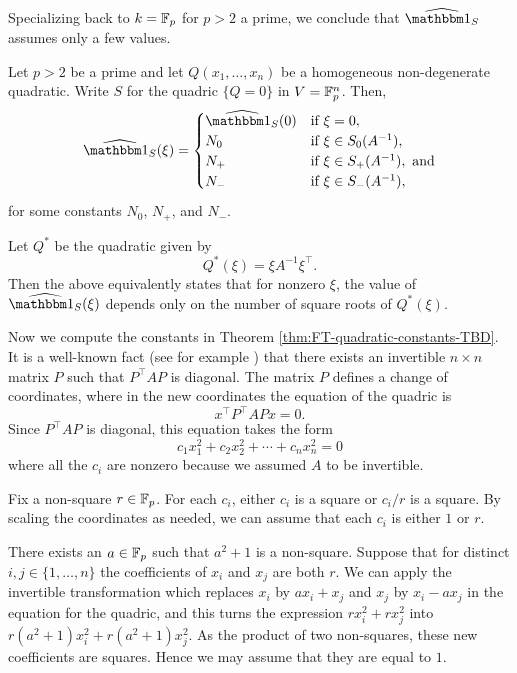 Specializing back to $k=\mathbb{F}_p$ for $p>2$ a prime, we conclude that $\widehat{\IND_S}$ assumes only a few values.

\begin{thm}\label{thm:FT-quadratic-constants-TBD}
	Let $p > 2$ be a prime and let $Q(x_1,\ldots,x_n)$ be a homogeneous non-degenerate quadratic. Write $S$ for the quadric $\{Q = 0\}$ in $V=\mathbb{F}_p^n$. Then,
	\begin{equation}
	\widehat{\IND_S}(\xi) = \begin{cases}
	\widehat{\IND_S}(0) & \text{if } \xi = 0,\\
	N_0 & \text{if } \xi \in S_0(A^{-1}),\\
	N_+ & \text{if } \xi \in S_+(A^{-1}), \text{ and}\\
	N_- & \text{if } \xi \in S_-(A^{-1}),
	\end{cases}
	\end{equation}
	for some constants $N_0$, $N_+$, and $N_-$.
\end{thm}
Let $Q^*$ be the quadratic given by
\[
	Q^*(\xi) = \xi A^{-1} \xi^\top.
\]
Then the above equivalently states that for nonzero $\xi$, the value of $\widehat{\IND_S}(\xi)$ depends only on the number of square roots of $Q^*(\xi)$.

Now we compute the constants in Theorem \ref{thm:FT-quadratic-constants-TBD}. It is a well-known fact (see for example \cite[Prop.~42:1]{omeara}) that there exists an invertible $n\times n$ matrix $P$ such that $P^\top A P$ is diagonal. The matrix $P$ defines a change of coordinates, where in the new coordinates the equation of the quadric is
\[
x^\top P^\top A P x = 0.
\]
Since $P^\top A P$ is diagonal, this equation takes the form
\[
c_1 x_1^2 + c_2 x_2^2 + \cdots + c_n x_n^2 = 0
\]
where all the $c_i$ are nonzero because we assumed $A$ to be invertible.

Fix a non-square $r\in \mathbb{F}_p$. For each $c_i$, either $c_i$ is a square or $c_i / r$ is a square. By scaling the coordinates as needed, we can assume that each $c_i$ is either $1$ or $r$.

There exists an $a\in\mathbb{F}_p$ such that $a^2 + 1$ is a non-square. Suppose that for distinct $i,j\in\{1,\ldots,n\}$ the coefficients of $x_i$ and $x_j$ are both $r$. We can apply the invertible transformation which replaces $x_i$ by $ax_i + x_j$ and $x_j$ by $x_i - ax_j$ in the equation for the quadric, and this turns the expression $rx_i^2 + rx_j^2$ into $r(a^2 + 1)x_i^2 + r(a^2+1)x_j^2$. As the product of two non-squares, these new coefficients are squares. Hence we may assume that they are equal to $1$.

